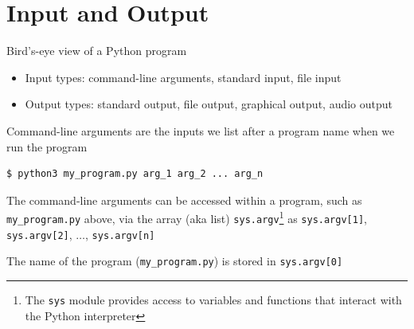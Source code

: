 \documentclass[8pt,a4paper,compress]{beamer}
\begin{document}
\section{Input and Output}
\begin{frame}[fragile]
\pause

Bird's-eye view of a Python program
\begin{center}
\end{center}
\begin{itemize}
\item Input types: command-line arguments, standard input, file input
\item Output types: standard output, file output, graphical output, audio output
\end{itemize}
\end{frame}

\begin{frame}[fragile]
\pause

Command-line arguments are the inputs we list after a program name when we run the program

\begin{lstlisting}[language={}]
$ python3 my_program.py arg_1 arg_2 ... arg_n
\end{lstlisting}

\pause
\bigskip

The command-line arguments can be accessed within a program, such as \lstinline{my_program.py} above, via the array (aka list) \lstinline{sys.argv}\footnote{The \lstinline{sys} module provides access to variables and functions that interact with the Python interpreter}  as \lstinline{sys.argv[1]}, \lstinline{sys.argv[2]}, $\dots$, \lstinline{sys.argv[n]}

\pause
\bigskip

The name of the program (\lstinline{my_program.py}) is stored in \lstinline{sys.argv[0]} 
\end{frame}
\end{document}
